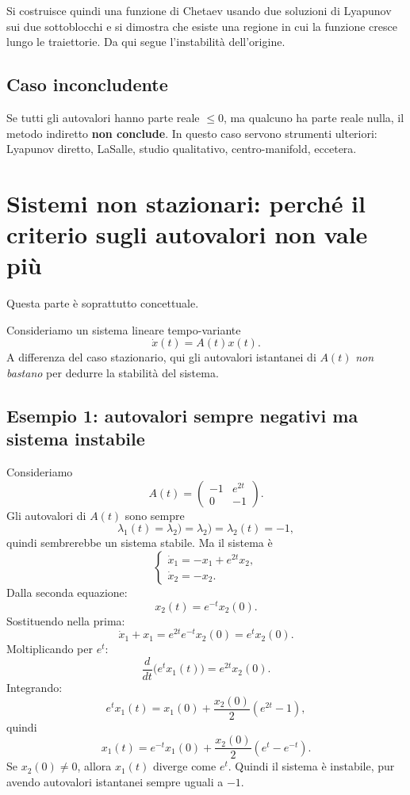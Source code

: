 Si costruisce quindi una funzione di Chetaev usando due soluzioni di Lyapunov sui due sottoblocchi e si dimostra che esiste una regione in cui la funzione cresce lungo le traiettorie. Da qui segue l'instabilit\`a dell'origine.

\subsection{Caso inconcludente}

Se tutti gli autovalori hanno parte reale \(\le 0\), ma qualcuno ha parte reale nulla, il metodo indiretto \textbf{non conclude}.  
In questo caso servono strumenti ulteriori: Lyapunov diretto, LaSalle, studio qualitativo, centro-manifold, eccetera.

\section{Sistemi non stazionari: perch\'e il criterio sugli autovalori non vale pi\`u}
\label{sec:L24-nonstazionari}

Questa parte \`e soprattutto concettuale.

Consideriamo un sistema lineare tempo-variante
\[
\dot x(t)=A(t)x(t).
\]
A differenza del caso stazionario, qui gli autovalori istantanei di \(A(t)\) \emph{non bastano} per dedurre la stabilit\`a del sistema.

\subsection{Esempio 1: autovalori sempre negativi ma sistema instabile}

Consideriamo
\[
A(t)=
\begin{pmatrix}
-1 & e^{2t}\\
0 & -1
\end{pmatrix}.
\]
Gli autovalori di \(A(t)\) sono sempre
\[
\lambda_1(t)=\lambda_2)=\lambda_2)=\lambda_2(t)=-1,
\]
quindi sembrerebbe un sistema stabile. Ma il sistema \`e
\[
\begin{cases}
\dot x_1 = -x_1 + e^{2t}x_2,\\[4pt]
\dot x_2 = -x_2.
\end{cases}
\]
Dalla seconda equazione:
\[
x_2(t)=e^{-t}x_2(0).
\]
Sostituendo nella prima:
\[
\dot x_1 + x_1 = e^{2t}e^{-t}x_2(0)=e^t x_2(0).
\]
Moltiplicando per \(e^t\):
\[
\frac{d}{dt}\bigl(e^t x_1(t)\bigr)=e^{2t}x_2(0).
\]
Integrando:
\[
e^t x_1(t)=x_1(0)+\frac{x_2(0)}{2}(e^{2t}-1),
\]
quindi
\[
x_1(t)=e^{-t}x_1(0)+\frac{x_2(0)}{2}(e^t-e^{-t}).
\]
Se \(x_2(0)\neq 0\), allora \(x_1(t)\) diverge come \(e^t\). Quindi il sistema \`e instabile, pur avendo autovalori istantanei sempre uguali a \(-1\).

